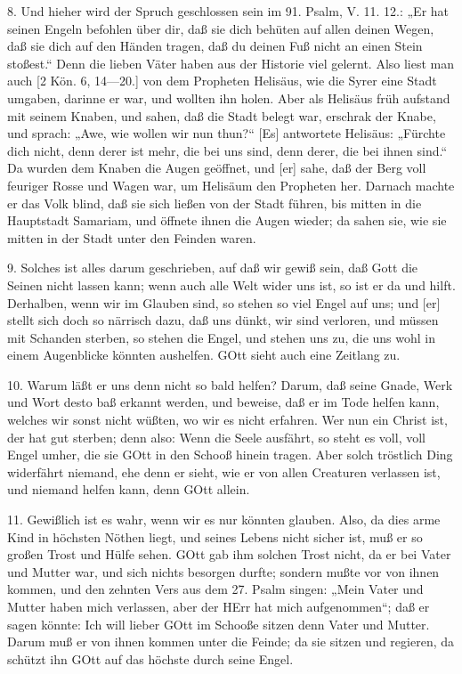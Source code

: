 8. Und hieher wird der Spruch geschlossen sein im 91. Psalm, V. 11. 12.: „Er hat seinen Engeln befohlen über dir, daß sie dich behüten auf allen deinen Wegen, daß sie dich auf den Händen tragen, daß du deinen Fuß nicht an einen Stein stoßest.“ Denn die lieben Väter haben aus der Historie viel gelernt. Also liest man auch [2 Kön. 6, 14—20.] von dem Propheten Helisäus, wie die Syrer eine Stadt umgaben, darinne er war, und wollten ihn holen. Aber als Helisäus früh aufstand mit seinem Knaben, und sahen, daß die Stadt belegt war, erschrak der Knabe, und sprach: „Awe, wie wollen wir nun thun?“ [Es] antwortete Helisäus: „Fürchte dich nicht, denn derer ist mehr, die bei uns sind, denn derer, die bei ihnen sind.“ Da wurden dem Knaben die Augen geöffnet, und [er] sahe, daß der Berg voll feuriger Rosse und Wagen war, um Helisäum den Propheten her. Darnach machte er das Volk blind, daß sie sich ließen von der Stadt führen, bis mitten in die Hauptstadt Samariam, und öffnete ihnen die Augen wieder; da sahen sie, wie sie mitten in der Stadt unter den Feinden waren.

9. Solches ist alles darum geschrieben, auf daß wir gewiß sein, daß Gott die Seinen nicht lassen kann; wenn auch alle Welt wider uns ist,
so ist er da und hilft. Derhalben, wenn wir im Glauben sind, so stehen so viel Engel auf uns; und [er] stellt sich doch so närrisch dazu, daß uns dünkt, wir sind verloren, und müssen mit Schanden sterben, so stehen die Engel, und stehen uns zu, die uns wohl in einem Augenblicke könnten aushelfen. GOtt sieht auch eine Zeitlang zu.

10. Warum läßt er uns denn nicht so bald helfen? Darum, daß seine Gnade, Werk und Wort desto baß erkannt werden, und beweise, daß er im Tode helfen kann, welches wir sonst nicht wüßten, wo wir es nicht erfahren. Wer nun ein Christ ist, der hat gut sterben; denn also: Wenn die Seele ausfährt, so steht es voll, voll Engel umher, die sie GOtt in den Schooß hinein tragen. Aber solch tröstlich Ding widerfährt niemand, ehe denn er sieht, wie er von allen Creaturen verlassen ist, und niemand helfen kann, denn GOtt allein.

11. Gewißlich ist es wahr, wenn wir es nur könnten glauben. Also, da dies arme Kind in höchsten Nöthen liegt, und seines Lebens nicht sicher ist, muß er so großen Trost und Hülfe sehen. GOtt gab ihm solchen Trost nicht, da er bei Vater und Mutter war, und sich nichts besorgen durfte; sondern mußte vor von ihnen kommen, und den zehnten Vers aus dem 27. Psalm singen: „Mein Vater und Mutter haben mich verlassen, aber der HErr hat mich aufgenommen“; daß er sagen könnte: Ich will lieber GOtt im Schooße sitzen denn Vater und Mutter. Darum muß er von ihnen kommen unter die Feinde; da sie sitzen und regieren, da schützt ihn GOtt auf das höchste durch seine Engel.

